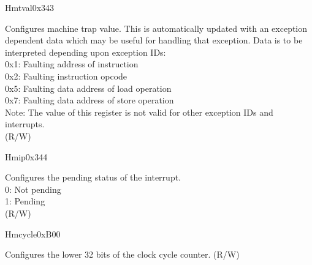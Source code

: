 \begin{register}{H}{mtval}{0x343}\label{regdesc:LPMTVAL}
%
\regnewline%
\begin{regdesc}\begin{reglist}
\label{fielddesc:LPMTVAL}\item [MTVAL] Configures machine trap value. This is automatically updated with an exception dependent data which may be useful for handling that exception. Data is to be interpreted depending upon exception IDs:\\
0x1: Faulting address of instruction\\
0x2: Faulting instruction opcode\\
0x5: Faulting data address of load operation\\
0x7: Faulting data address of store operation\\
Note: The value of this register is not valid for other exception IDs and interrupts.\\
(R/W)
\end{reglist}\end{regdesc}
\end{register}

\begin{register}{H}{mip}{0x344}\label{regdesc:LPMIP}
%
%
%
\regnewline%
\begin{regdesc}\begin{reglist}
\label{fielddesc:LPMIPSIP}\item [IP] Configures the pending status of the interrupt. \\
0: Not pending\\
1: Pending\\
(R/W)
\end{reglist}\end{regdesc}
\end{register}

\begin{register}{H}{mcycle}{0xB00}\label{regdesc:LPMCYCLE}
%
\regnewline%
\begin{regdesc}\begin{reglist}
\label{fielddesc:LPMCYCLE}\item [MCYCLE] Configures the lower 32 bits of the clock cycle counter. (R/W)
\end{reglist}\end{regdesc}
\end{register}

